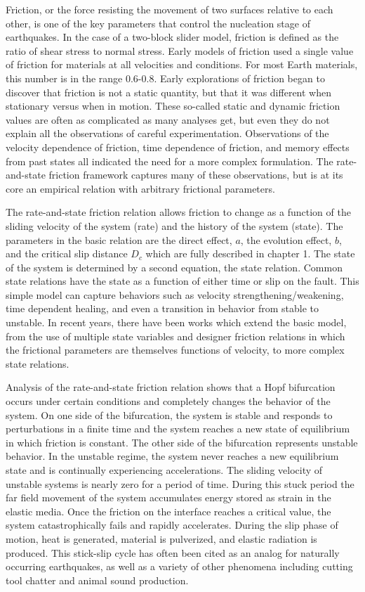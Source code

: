 Friction, or the force resisting the movement of two surfaces relative to each other, is one of the key parameters that control the nucleation stage of earthquakes. In the case of a two-block slider model, friction is defined as the ratio of shear stress to normal stress. Early models of friction used a single value of friction for materials at all velocities and conditions. For most Earth materials, this number is in the range 0.6-0.8. Early explorations of friction began to discover that friction is not a static quantity, but that it was different when stationary versus when in motion. These so-called static and dynamic friction values are often as complicated as many analyses get, but even they do not explain all the observations of careful experimentation. Observations of the velocity dependence of friction, time dependence of friction, and memory effects from past states all indicated the need for a more complex formulation. The rate-and-state friction framework captures many of these observations, but is at its core an empirical relation with arbitrary frictional parameters.

The rate-and-state friction relation allows friction to change as a function of the sliding velocity of the system (rate) and the history of the system (state). The parameters in the basic relation are the direct effect, $a$, the evolution effect, $b$, and the critical slip distance $D_c$ which are fully described in chapter 1. The state of the system is determined by a second equation, the state relation. Common state relations have the state as a function of either time or slip on the fault. This simple model can capture behaviors such as velocity strengthening/weakening, time dependent healing, and even a transition in behavior from stable to unstable. In recent years, there have been works which extend the basic model, from the use of multiple state variables and designer friction relations in which the frictional parameters are themselves functions of velocity, to more complex state relations.

Analysis of the rate-and-state friction relation shows that a Hopf bifurcation occurs under certain conditions and completely changes the behavior of the system. On one side of the bifurcation, the system is stable and responds to perturbations in a finite time and the system reaches a new state of equilibrium in which friction is constant. The other side of the bifurcation represents unstable behavior. In the unstable regime, the system never reaches a new equilibrium state and is continually experiencing accelerations. The sliding velocity of unstable systems is nearly zero for a period of time. During this stuck period the far field movement of the system accumulates energy stored as strain in the elastic media. Once the friction on the interface reaches a critical value, the system catastrophically fails and rapidly accelerates. During the slip phase of motion, heat is generated, material is pulverized, and elastic radiation is produced. This stick-slip cycle has often been cited as an analog for naturally occurring earthquakes, as well as a variety of other phenomena including cutting tool chatter and animal sound production.


